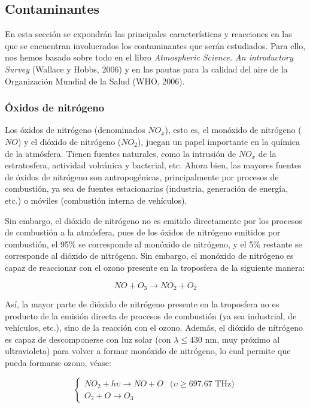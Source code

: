 \documentclass[12pt]{article}
\begin{document}
\subsection{Contaminantes}

En esta sección se expondrán las principales características y reacciones en las que se encuentran involucrados los contaminantes que serán estudiados. Para ello, nos hemos basado sobre todo en el libro \textit{Atmospheric Science. An introductory Survey} (Wallace y Hobbs, 2006) y en las pautas para la calidad del aire de la Organización Mundial de la Salud (WHO, 2006).

\subsubsection{Óxidos de nitrógeno}

Los óxidos de nitrógeno (denominados $NO_{x}$), esto es, el monóxido de nitrógeno ($NO$) y el dióxido de nitrógeno ($NO_{2}$), juegan un papel importante en la química de la atmósfera. Tienen fuentes naturales, como la intrusión de $NO_{x}$ de la estratosfera, actividad volcánica y bacterial, etc. Ahora bien, las mayores fuentes de óxidos de nitrógeno son antropogénicas, principalmente por procesos de combustión, ya sea de fuentes estacionarias (industria, generación de energía, etc.) o móviles (combustión interna de vehículos).

Sin embargo, el dióxido de nitrógeno no es emitido directamente por los procesos de combustión a la atmósfera, pues de los óxidos de nitrógeno emitidos por combustión, el 95\% se corresponde al monóxido de nitrógeno, y el 5\% restante se corresponde al dióxido de nitrógeno. Sin embargo, el monóxido de nitrógeno es capaz de reaccionar con el ozono presente en la troposfera de la siguiente manera:

\begin{equation}
NO + O_{3} \rightarrow NO_{2} + O_{2}
\label{eq:no-to-no2}
\end{equation}

Así, la mayor parte de dióxido de nitrógeno presente en la troposfera no es producto de la emisión directa de procesos de combustión (ya sea industrial, de vehículos, etc.), sino de la reacción con el ozono. Además, el dióxido de nitrógeno es capaz de descomponerse con luz solar (con $\lambda \leq 430$ nm, muy próximo al ultravioleta) para volver a formar monóxido de nitrógeno, lo cual permite que pueda formarse ozono, véase:

\begin{equation}
\begin{cases}
NO_{2} + h\upsilon \rightarrow NO + O &\text{($\upsilon \geq 697.67$ THz)}\\
O_{2} + O \rightarrow O_{3} & 
\end{cases} 
\label{eq:no2-to-no}
\end{equation}
\end{document}

